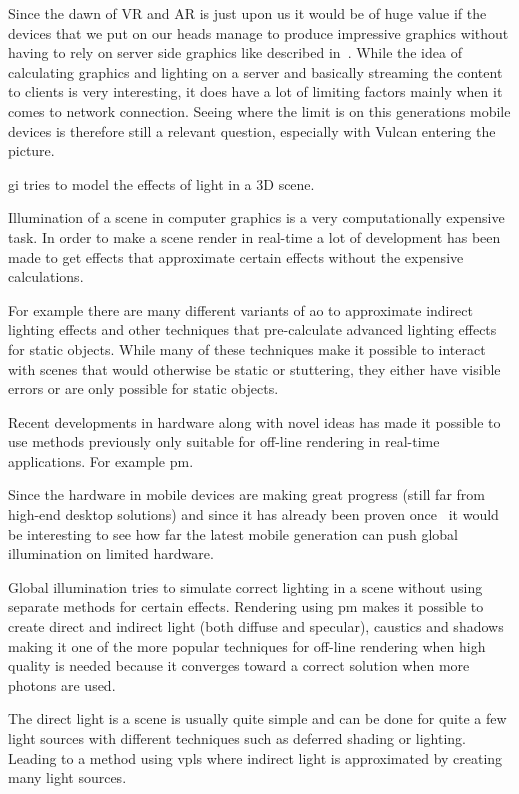 \documentclass[a4paper, 12pt]{article}
\begin{document}
Since the dawn of VR and AR is just upon us it would be of huge value if the devices that we put on our heads manage to produce impressive graphics without having to rely on server side graphics like described in~\cite{cloudlight}. While the idea of calculating graphics and lighting on a server and basically streaming the content to clients is very interesting, it does have a lot of limiting factors mainly when it comes to network connection.
Seeing where the limit is on this generations mobile devices is therefore still a relevant question, especially with Vulcan entering the picture.

\gls{gi} tries to model the effects of light in a 3D scene.

Illumination of a scene in computer graphics is a very computationally expensive task. In order to make a scene render in real-time a lot of development has been made to get effects that approximate certain effects without the expensive calculations.

For example there are many different variants of \gls{ao} to approximate indirect lighting effects and other techniques that pre-calculate advanced lighting effects for static objects. While many of these techniques make it possible to interact with scenes that would otherwise be static or stuttering, they either have visible errors or are only possible for static objects.

Recent developments in hardware along with novel ideas has made it possible to use methods previously only suitable for off-line rendering in real-time applications. For example \gls{pm}.

Since the hardware in mobile devices are making great progress (still far from high-end desktop solutions) and since it has already been proven once~\cite{gimobile} it would be interesting to see how far the latest mobile generation can push global illumination on limited hardware.

Global illumination tries to simulate correct lighting in a scene without using separate methods for certain effects. Rendering using \gls{pm} makes it possible to create direct and indirect light (both diffuse and specular), caustics and shadows making it one of the more popular techniques for off-line rendering when high quality is needed because it converges toward a correct solution when more photons are used.

The direct light is a scene is usually quite simple and can be done for quite a few light sources with different techniques such as deferred shading or lighting. Leading to a method using \glspl{vpl} where indirect light is approximated by creating many light sources.
\end{document}
